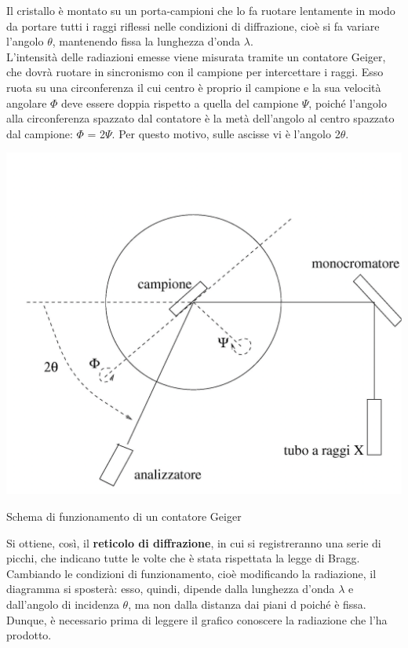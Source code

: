 Il cristallo è montato su un porta-campioni che lo fa ruotare lentamente in modo da portare tutti i raggi riflessi nelle condizioni di diffrazione, cioè si fa variare l’angolo $\theta$, mantenendo fissa la lunghezza d’onda $\lambda$.\\
L’intensità delle radiazioni emesse viene misurata tramite un contatore Geiger, che dovrà ruotare in sincronismo con il campione per intercettare i raggi. Esso ruota su una circonferenza il cui centro è proprio il campione e la sua velocità angolare $\Phi$ deve essere doppia rispetto a quella del campione $\Psi$, poiché l’angolo alla circonferenza spazzato dal contatore è la metà dell’angolo al centro spazzato dal campione: $\Phi$ = 2$\Psi$. Per questo motivo, sulle ascisse vi è l’angolo 2$\theta$.
\begin{marginfigure}[-5.5cm]
     \includegraphics{images/img12.png}
     \caption{Schema di funzionamento di un contatore Geiger}
\end{marginfigure}
Si ottiene, così, il \textbf{reticolo di diffrazione}, in cui si registreranno una serie di picchi, che indicano tutte le volte che è stata rispettata la legge di Bragg.\\
Cambiando le condizioni di funzionamento, cioè modificando la radiazione, il diagramma si sposterà: esso, quindi, dipende dalla lunghezza d’onda $\lambda$ e dall’angolo di incidenza $\theta$, ma non dalla distanza dai piani d poiché è fissa.
Dunque, è necessario prima di leggere il grafico conoscere la radiazione che l’ha prodotto.
